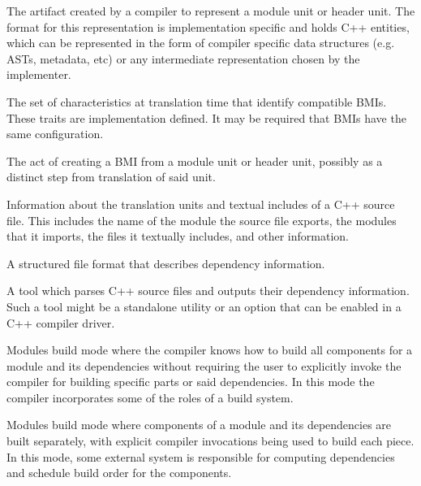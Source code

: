 The artifact created by a compiler to represent a module unit or header unit.
The format for this representation is implementation specific and holds C++
entities, which can be represented in the form of compiler specific data
structures (e.g. ASTs, metadata, etc) or any intermediate representation chosen
by the implementer.

The set of characteristics at translation time that identify compatible BMIs.
These traits are implementation defined.
It may be required that BMIs have the same configuration.

The act of creating a BMI from a module unit or header unit, possibly as a
distinct step from translation of said unit.

Information about the translation units and textual includes of a C++ source
file.
This includes the name of the module the source file exports, the modules that
it imports, the files it textually includes, and other information.

A structured file format that describes dependency information.

A tool which parses C++ source files and outputs their dependency information.
Such a tool might be a standalone utility or an option that can be enabled in a
C++ compiler driver.

Modules build mode where the compiler knows how to build all components for a
module and its dependencies without requiring the user to explicitly invoke the
compiler for building specific parts or said dependencies.
In this mode the compiler incorporates some of the roles of a build system.

Modules build mode where components of a module and its dependencies are built
separately, with explicit compiler invocations being used to build each piece.
In this mode, some external system is responsible for computing dependencies
and schedule build order for the components.

